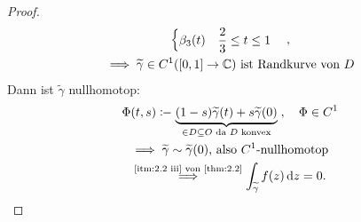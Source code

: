 \begin{theorem}[Hilfssatz]
\begin{proof}
\begin{gather*}
\begin{dcases}
        \beta_3(t) & \frac{2}{3} \leq t \leq 1
      \end{dcases} \quad, \\
      \implies \widetilde{\gamma} \in C^1([0,1] \to \mathbb{C}) \text{ ist Randkurve von $D$}
    \end{gather*}
    Dann ist $\widetilde{\gamma}$ nullhomotop:
    \begin{gather*}
      \Phi(t,s) \coloneq \underbrace{(1-s) \widetilde{\gamma}(t) + s \widetilde{\gamma}(0)}_{\in D \subseteq O \text{ da $D$ konvex}} \; , \quad \Phi \in C^1 \\
      \implies \widetilde{\gamma} \sim \widetilde{\gamma}(0) \text{, also $C^1$-nullhomotop} \\
      \overset{\text{\ref{itm:2.2 iii} von \ref{thm:2.2}}}{\implies} \int_{\widetilde{\gamma}} f(z) \, \mathrm{d}z = 0.
    \end{gather*}
  \end{proof}
\end{theorem}

